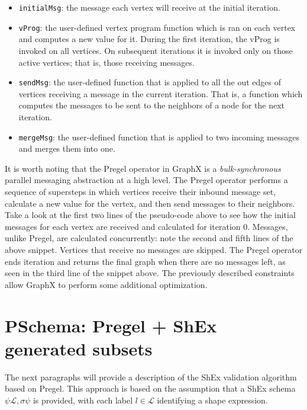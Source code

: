\begin{itemize}
    \item \texttt{initialMsg}: the message each vertex will receive at the initial iteration.
    \item \texttt{vProg}: the user-defined vertex program function which is ran on each vertex and computes a new value for it. During the first iteration, the vProg is invoked on all vertices. On subsequent iterations it is invoked only on those active vertices; that is, those receiving messages.
    \item \texttt{sendMsg}: the user-defined function that is applied to all the out edges of vertices receiving a message in the current iteration. That is, a function which computes the messages to be sent to the neighbors of a node for the next iteration.
    \item \texttt{mergeMsg}: the user-defined function that is applied to two incoming messages and merges them into one.
\end{itemize}

\begin{pseudocode}
    
\end{pseudocode}

It is worth noting that the Pregel operator in GraphX is a \textit{bulk-synchronous} parallel messaging abstraction at a high level. The Pregel operator performs a sequence of supersteps in which vertices receive their inbound message set, calculate a new value for the vertex, and then send messages to their neighbors. Take a look at the first two lines of the pseudo-code above to see how the initial messages for each vertex are received and calculated for iteration 0. Messages, unlike Pregel, are calculated concurrently: note the second and fifth lines of the above snippet. Vertices that receive no messages are skipped. The Pregel operator ends iteration and returns the final graph when there are no messages left, as seen in the third line of the snippet above. The previously described constraints allow GraphX to perform some additional optimization.

\section{PSchema: Pregel + ShEx generated subsets}

The next paragraphs will provide a description of the ShEx validation algorithm based on Pregel. This approach is based on the assumption that a ShEx schema $\psi \mathcal{L},\sigma \psi$ is provided,  with each label $l \in \mathcal{L}$ identifying a shape expression.


